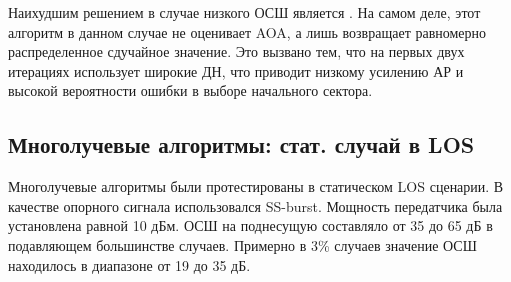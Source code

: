 Наихудшим решением в случае низкого ОСШ является \ACS. На самом деле, этот
алгоритм в данном случае не оценивает AOA, а лишь возвращает равномерно
распределенное сдучайное значение. Это вызвано тем, что \ACS на первых двух
итерациях использует широкие ДН, что приводит низкому усилению АР и высокой
вероятности ошибки в выборе начального сектора. 


\subsection{Многолучевые алгоритмы: стат. случай в LOS}

Многолучевые алгоритмы были протестированы в статическом LOS сценарии. В
качестве опорного сигнала использовался SS-burst.  Мощность передатчика была
установлена равной 10 дБм. ОСШ на поднесущую
составляло от 35 до 65 дБ в подавляющем большинстве случаев. Примерно в 3\%
случаев значение ОСШ находилось в диапазоне от 19 до 35 дБ.  

